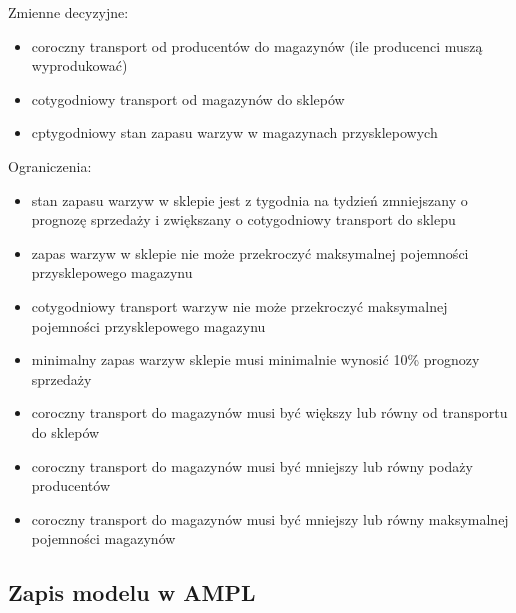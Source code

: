 \documentclass{article}
\begin{document}
  
Zmienne decyzyjne:
\begin{itemize}
   \item coroczny transport od producentów do magazynów (ile producenci muszą wyprodukować)
   \item cotygodniowy transport od magazynów do sklepów
   \item cptygodniowy stan zapasu warzyw w magazynach przysklepowych
 \end{itemize}
 
Ograniczenia:
\begin{itemize}
   \item stan zapasu warzyw w sklepie jest z tygodnia na tydzień zmniejszany o prognozę sprzedaży i zwiększany o cotygodniowy transport do sklepu
   \item zapas warzyw w sklepie nie może przekroczyć maksymalnej pojemności przysklepowego magazynu
   \item cotygodniowy transport warzyw nie może przekroczyć maksymalnej pojemności przysklepowego magazynu
   \item minimalny zapas warzyw sklepie musi minimalnie wynosić 10\% prognozy sprzedaży
   \item coroczny transport do magazynów musi być większy lub równy od transportu do sklepów
   \item coroczny transport do magazynów musi być mniejszy lub równy podaży producentów
   \item coroczny transport do magazynów musi być mniejszy lub równy maksymalnej pojemności magazynów
 \end{itemize}

\subsection{Zapis modelu w AMPL}
\end{document}
